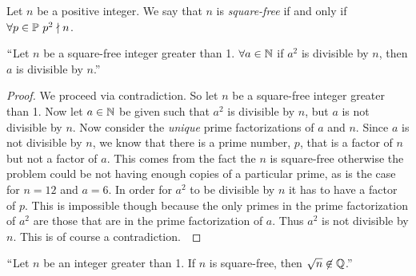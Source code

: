         \begin{definition}
            Let $n$ be a positive integer. We say that $n$ is \emph{square-free} if and only if
            $\forall p \in \set{P} \ \ndivides{p^2}{n}$.
        \end{definition}
        \begin{lemma}
            $``$Let $n$ be a square-free integer greater than 1. $\forall a \in \mathbb{N}$
            if $a^2$ is divisible by $n$, then $a$ is divisible by $n$.''
            \label{Square root of n irrational proof lemma}
        \end{lemma}
        \begin{proof}
            We proceed via contradiction. So let $n$ be a square-free integer greater than 1.
            Now let $a \in \mathbb{N}$ be given such that $a^2$ is divisible by $n$, but
            $a$ is not divisible by $n$. Now consider the \emph{unique} prime factorizations
            of $a$ and $n$. Since $a$ is not divisible by $n$, we know that there is a prime
            number, $p$, that is a factor of $n$ but not a factor of $a$. This comes from the fact
            the $n$ is square-free otherwise the problem could be not having enough copies of a
            particular prime, as is the case for $n = 12$ and $a = 6$. In order for $a^2$
            to be divisible by $n$ it has to have a factor of $p$. This is impossible though
            because the only primes in the prime factorization of $a^2$ are those that are
            in the prime factorization of $a$. Thus $a^2$ is not divisible by $n$. This is
            of course a contradiction.~\QED
        \end{proof}
        \begin{theorem}
            $``$Let $n$ be an integer greater than 1. If $n$ is square-free, then $\sqrt{n} \not\in \mathbb{Q}$.''
            \label{Square Root of Square Free Irrational}
        \end{theorem}
